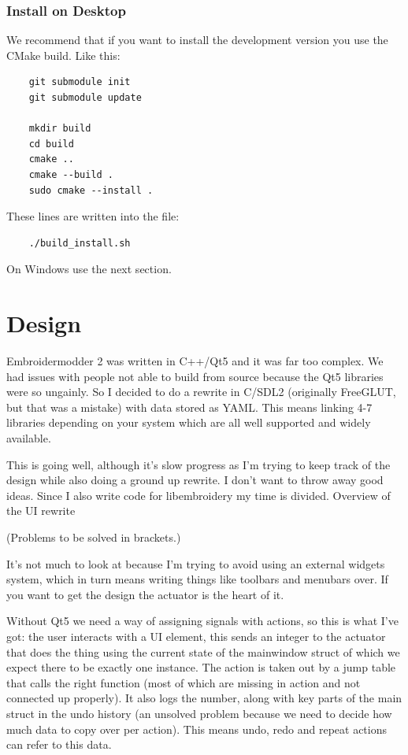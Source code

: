 \documentclass{report}
\begin{document}
\subsection{Install on Desktop}

We recommend that if you want to install the development version you use the CMake build. Like this:

\begin{lstlisting}
    git submodule init
    git submodule update

    mkdir build
    cd build
    cmake ..
    cmake --build .
    sudo cmake --install .
\end{lstlisting}

These lines are written into the file:

\begin{lstlisting}
    ./build_install.sh
\end{lstlisting}

On Windows use the next section.

\chapter{Design}

Embroidermodder 2 was written in C++/Qt5 and it was far too complex. We had issues with people
not able to build from source because the Qt5 libraries were so ungainly. So I decided to do a
rewrite in C/SDL2 (originally FreeGLUT, but that was a mistake) with data stored as YAML. This
means linking 4-7 libraries depending on your system which are all well supported and widely available.

This is going well, although it's slow progress as I'm trying to keep track of the design while
also doing a ground up rewrite. I don't want to throw away good ideas. Since I also write code
for libembroidery my time is divided.
Overview of the UI rewrite

(Problems to be solved in brackets.)

It's not much to look at because I'm trying to avoid using an external widgets system, which
in turn means writing things like toolbars and menubars over. If you want to get the design
the actuator is the heart of it.

Without Qt5 we need a way of assigning signals with actions, so this is what I've got: the user interacts with a UI element, this sends an integer to the actuator that does the thing using the current state of the mainwindow struct of which we expect there to be exactly one instance. The action is taken out by a jump table that calls the right function (most of which are missing in action and not connected up properly). It also logs the number, along with key parts of the main struct in the undo history (an unsolved problem because we need to decide how much data to copy over per action). This means undo, redo and repeat actions can refer to this data.
\end{document}
